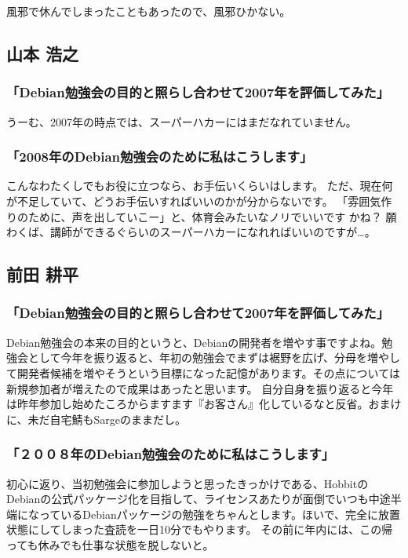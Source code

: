 \documentclass[mingoth,a4paper]{jsarticle}
\begin{document}
風邪で休んでしまったこともあったので、風邪ひかない。

\subsection{山本 浩之}

\subsubsection{「Debian勉強会の目的と照らし合わせて2007年を評価してみた」}

うーむ、2007年の時点では、スーパーハカーにはまだなれていません。

\subsubsection{「2008年のDebian勉強会のために私はこうします」}

こんなわたくしでもお役に立つなら、お手伝いくらいはします。
ただ、現在何が不足していて、どうお手伝いすればいいのかが分からないです。
「雰囲気作りのために、声を出していこー」と、体育会みたいなノリでいいです
かね？
願わくば、講師ができるぐらいのスーパーハカーになれればいいのですが…。

\subsection{前田 耕平}

\subsubsection{「Debian勉強会の目的と照らし合わせて2007年を評価してみた」}
Debian勉強会の本来の目的というと、Debianの開発者を増やす事ですよね。勉強会として今年を振り返ると、年初の勉強会でまずは裾野を広げ、分母を増やして開発者候補を増やそうという目標になった記憶があります。その点については新規参加者が増えたので成果はあったと思います。
自分自身を振り返ると今年は昨年参加し始めたころからますます『お客さん』化しているなと反省。おまけに、未だ自宅鯖もSargeのままだし。

\subsubsection{「２００８年のDebian勉強会のために私はこうします」}
初心に返り、当初勉強会に参加しようと思ったきっかけである、HobbitのDebianの公式パッケージ化を目指して、ライセンスあたりが面倒でいつも中途半端になっているDebianパッケージの勉強をちゃんとします。ほいで、完全に放置状態にしてしまった査読を一日10分でもやります。
その前に年内には、この帰っても休みでも仕事な状態を脱しないと。
\end{document}
